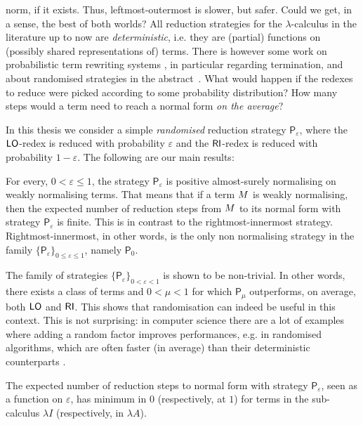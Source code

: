 norm, if it exists. Thus, leftmost-outermost is slower, but
safer. Could we get, in a sense, the best of both worlds?  All
reduction strategies for the $\lambda$-calculus in the literature up
to now are \emph{deterministic}, i.e. they are (partial) functions on
(possibly shared representations of) terms. There is however some work on probabilistic term
rewriting systems
\cite{bournez_proving_2005,ferrer_fioriti_probabilistic_2015,avanzini_probabilistic_2018},
in particular regarding termination, and about randomised strategies
in the abstract~\cite{bournez_probabilistic_2002}. What would
happen if the redexes to reduce were picked according to some
probability distribution? How many steps would a term need to reach a
normal form \emph{on the average}?

In this thesis we consider a simple \emph{randomised}
reduction strategy $\mathsf{P}_\varepsilon$, where the $\textsf{LO}$-redex
is reduced with probability $\varepsilon$ and the $\textsf{RI}$-redex is
reduced with probability $1-\varepsilon$. The following are our main results:
\begin{varitemize}
	\item
	For every, $0<\varepsilon\leq 1$, the strategy
	$\mathsf{P}_\varepsilon$ is positive almost-surely normalising on
	weakly normalising terms. That means that if a term $M$ is
	weakly normalising, then the expected number of reduction steps from
	$M$ to its normal form with strategy $\mathsf{P}_\varepsilon$
	is finite. This is in contrast to the rightmost-innermost strategy. Rightmost-innermost, in other
	words, is the only non normalising strategy in the family
	$\{\mathsf{P}_\varepsilon\}_{0\leq\varepsilon\leq 1}$, namely $\mathsf{P}_0$.
	\item
	The family of strategies
	$\{\mathsf{P}_\varepsilon\}_{0<\varepsilon<1}$ is shown to be
	non-trivial. In other words, there exists a class of terms and
	$0<\mu<1$ for which $\mathsf{P}_\mu$ outperforms, on average, both
	$\textsf{LO}$ and $\textsf{RI}$. This shows that randomisation can
	indeed be useful in this context. This is not surprising:
	in computer science there are a lot of examples where adding a random factor
	improves performances, e.g. in randomised algorithms, which are
	often faster (in average) than their deterministic counterparts
	\cite{motwani_randomized_1995}.
	\item
	The expected number of reduction steps to
	normal form with strategy $\mathsf{P}_\varepsilon$, seen as a function
	on $\varepsilon$, has minimum in $0$ (respectively, at $1$) for terms
	in the sub-calculus $\lambda I$ (respectively, in $\lambda A$).
\end{varitemize}

